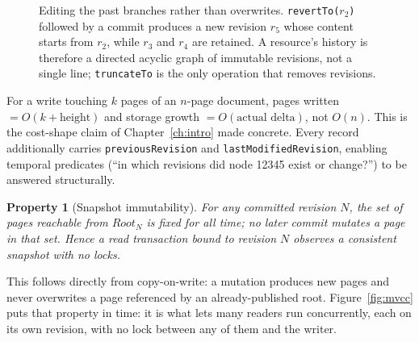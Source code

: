 \documentclass[11pt,a4paper,oneside]{report}
\theoremstyle{sirixthm}
\newtheorem{property}{Property}[chapter]
\newcommand{\code}[1]{\texttt{#1}}
\begin{document}
\begin{figure}[t]
\centering
{}
\caption{Editing the past branches rather than overwrites. \code{revertTo($r_2$)} followed by a commit
produces a new revision $r_5$ whose content starts from $r_2$, while $r_3$ and $r_4$ are retained. A
resource's history is therefore a directed acyclic graph of immutable revisions, not a single line;
\code{truncateTo} is the only operation that removes revisions.}
\label{fig:revdag}
\end{figure}

For a write touching $k$ pages of an $n$-page document, pages written $= O(k + \text{height})$
and storage growth $= O(\text{actual delta})$, not $O(n)$. This is the cost-shape claim
of Chapter~\ref{ch:intro} made concrete. Every record additionally carries
\code{previousRevision} and \code{lastModifiedRevision}, enabling temporal predicates
(``in which revisions did node 12345 exist or change?'') to be answered structurally.

\begin{property}[Snapshot immutability]\label{prop:snapshot}
For any committed revision $N$, the set of pages reachable from $\textit{Root}_N$ is fixed
for all time; no later commit mutates a page in that set. Hence a read transaction bound
to revision $N$ observes a consistent snapshot with no locks.
\end{property}
This follows directly from copy-on-write: a mutation produces new pages and never
overwrites a page referenced by an already-published root. Figure~\ref{fig:mvcc} puts that property in
time: it is what lets many readers run concurrently, each on its own revision, with no lock between any of
them and the writer.
\end{document}
